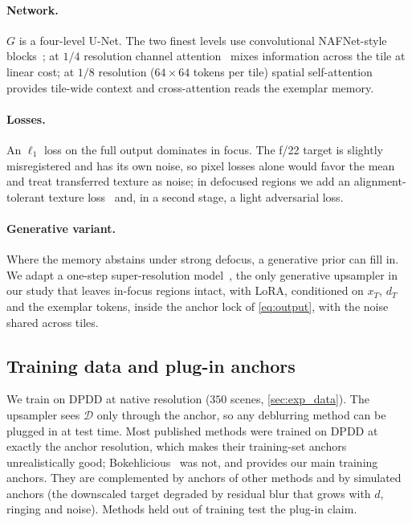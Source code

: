 \paragraph{Network.} $G$ is a four-level U-Net. The two finest levels use convolutional NAFNet-style
blocks~\cite{chen2022nafnet}; at $1/4$ resolution channel attention~\cite{zamir2022restormer} mixes
information across the tile at linear cost; at $1/8$ resolution ($64\times64$ tokens per tile) spatial
self-attention provides tile-wide context and cross-attention reads the exemplar memory.
\paragraph{Losses.} An $\ell_1$ loss on the full output dominates in focus. The f/22 target is slightly
misregistered and has its own noise, so pixel losses alone would favor the mean and treat transferred
texture as noise; in defocused regions we add an alignment-tolerant texture
loss~\cite{mechrez2018contextual} and, in a second stage, a light adversarial loss.
\paragraph{Generative variant.} Where the memory abstains under strong defocus, a generative prior
can fill in. We adapt a one-step super-resolution model~\cite{wu2026vosr}, the only generative
upsampler in our study that leaves in-focus regions intact, with LoRA, conditioned on $x_T$, $d_T$ and
the exemplar tokens, inside the anchor lock of \cref{eq:output}, with the noise shared across tiles.

\subsection{Training data and plug-in anchors}
\label{sec:training}
We train on DPDD at native resolution ($350$ scenes, \cref{sec:exp_data}). The upsampler sees $\mathcal{D}$
only through the anchor, so any deblurring method can be plugged in at test time. Most published
methods were trained on DPDD at exactly the anchor resolution, which makes their training-set anchors
unrealistically good; Bokehlicious~\cite{seizinger2025bokehlicious} was not, and provides our main
training anchors. They are complemented by anchors of other methods and by simulated anchors (the
downscaled target degraded by residual blur that grows with $d$, ringing and noise). Methods held out
of training test the plug-in claim.
